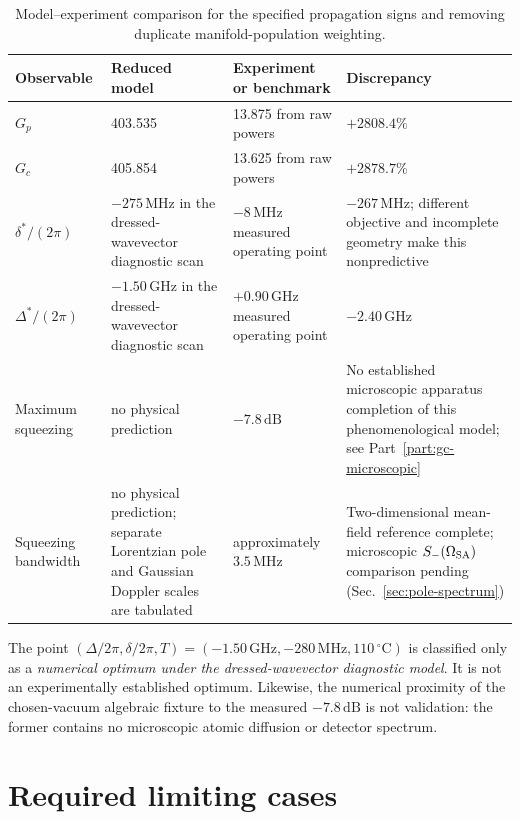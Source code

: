 \documentclass[11pt,a4paper]{article}
\newcommand{\GHz}{\,\mathrm{GHz}}
\newcommand{\MHz}{\,\mathrm{MHz}}
\newcommand{\dB}{\,\mathrm{dB}}
\newcommand{\degC}{\,^{\circ}\mathrm C}
\begin{document}
\begin{table}[ht]
\centering
\caption{Model--experiment comparison for the specified propagation signs and
removing duplicate manifold-population weighting.}
\label{tab:discrepancies}
\small
\begin{tabularx}{\textwidth}{L{3.0cm}L{3.5cm}L{3.2cm}Y}
\toprule
Observable & Reduced model & Experiment or benchmark & Discrepancy\\
\midrule
$G_p$ & 403.535 & 13.875 from raw powers & $+2808.4\%$\\
$G_c$ & 405.854 & 13.625 from raw powers & $+2878.7\%$\\
$\delta^*/(2\pi)$ & $-275\MHz$ in the dressed-wavevector diagnostic scan &
$-8\MHz$ measured operating point & $-267\MHz$; different objective and
incomplete geometry make this nonpredictive\\
$\Delta^*/(2\pi)$ & $-1.50\GHz$ in the dressed-wavevector diagnostic scan &
$+0.90\GHz$ measured operating point & $-2.40\GHz$\\
Maximum squeezing & no physical prediction & $-7.8\dB$ &
No established microscopic apparatus completion of this phenomenological model; see Part~\ref{part:gc-microscopic}\\
Squeezing bandwidth & no physical prediction; separate Lorentzian pole and
Gaussian Doppler scales are tabulated & approximately $3.5\MHz$ &
Two-dimensional mean-field reference complete; microscopic
$S_-(\Omega_{\rm SA})$ comparison pending (Sec.~\ref{sec:pole-spectrum})\\
\bottomrule
\end{tabularx}
\end{table}

The point
$(\Delta/2\pi,\delta/2\pi,T)=(-1.50\GHz,-280\MHz,110\degC)$ is classified
only as a \emph{numerical optimum under the dressed-wavevector diagnostic model}. It is
not an experimentally established optimum. Likewise, the numerical proximity
of the chosen-vacuum algebraic fixture to the measured $-7.8\dB$ is not
validation: the former contains no microscopic atomic diffusion or detector
spectrum.

\section{Required limiting cases}
\end{document}
